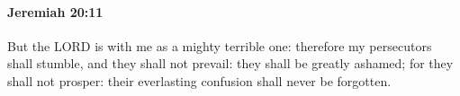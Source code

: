 
		\paragraph{Jeremiah 20:11} %
			\label{JEREMIAH-20-11}

			But the LORD is with me as a mighty terrible one: therefore my persecutors shall stumble, and they shall not prevail: they shall be greatly ashamed; for they shall not prosper: their everlasting confusion shall never be forgotten.


